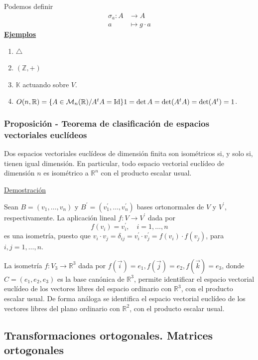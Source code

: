 \documentclass[12pt, a4paper, ones, notitlepage, openany,titlepage]{article}
\newcommand{\demostracion}{\noindent\underline{Demostración}}
\newcommand{\ejemplos}{\noindent\underline{\textbf{Ejemplos}}}
\begin{document}
Podemos definir
$$
\begin{aligned}
	\sigma_a : A & \longrightarrow A \\
	a & \longmapsto g \cdot a
\end{aligned}
$$
\ejemplos
\begin{enumerate}
	\item $\triangle$
	\item $(\mathbb{Z},+)$
	\item $\mathbb{K}$ actuando sobre $V$.
	\item $O(n, \mathbb{R}) = \{A \in \mathcal{M}_n (\mathbb{R}) /
	A^t A = \operatorname{Id}\} \\
	1 = \det A = \det(A^tA) = \det(A^t) = 1$.
\end{enumerate}

\subsubsection{Proposición - Teorema de clasificación de espacios vectoriales euclídeos}
Dos espacios vectoriales euclídeos de dimensión finita son isométricos si, y solo si, tienen igual dimensión. En particular, todo espacio vectorial euclídeo de dimensión $n$ es isométrico a $\mathbb{R}^{n}$ con el producto escalar usual.

\demostracion

Sean $B=\left(v_{1}, \ldots, v_{n}\right)$ y $B^{\prime}=\left(v_{1}^{\prime}, \ldots, v_{n}^{\prime}\right)$ bases ortonormales de $V$ y $V^{\prime}$, respectivamente. La aplicación lineal $f: V \rightarrow V^{\prime}$ dada por
$$
f\left(v_{i}\right)=v_{i}^{\prime}, \quad i=1, \ldots, n
$$
\noindent es una isometría, puesto que $v_{i} \cdot v_{j}=\delta_{i j}=v_{i}^{\prime} \cdot v_{j}^{\prime}=f\left(v_{i}\right) \cdot f\left(v_{j}\right)$, para $i, j=1, \ldots, n$.

La isometría $f: V_{3} \rightarrow \mathbb{R}^{3}$ dada por $f(\overrightarrow{i})=e_{1}, f(\overrightarrow{j})=e_{2}, f(\overrightarrow{k})=e_{3}$, donde $C=\left(e_{1}, e_{2}, e_{3}\right)$ es la base canónica de $\mathbb{R}^{3}$, permite identificar el espacio vectorial euclídeo de los vectores libres del espacio ordinario con $\mathbb{R}^{3}$, con el producto escalar usual. De forma análoga se identifica el espacio vectorial euclídeo de los vectores libres del plano ordinario con $\mathbb{R}^{2}$, con el producto escalar usual.

\subsection{Transformaciones ortogonales. Matrices ortogonales}
\end{document}
